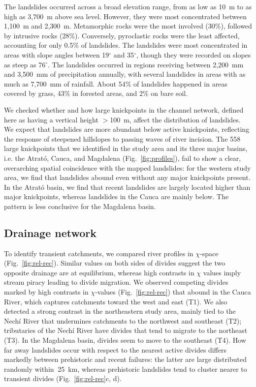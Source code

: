 \documentclass[draft]{agujournal2019}
\begin{document}
The landslides occurred across a broad elevation range, from as low as 10~m to as high as 3,700~m above sea level. However, they were most concentrated between 1,100~m and 2,300~m. Metamorphic rocks were the most involved (30\%), followed by intrusive rocks (28\%). Conversely, pyroclastic rocks were the least affected, accounting for only 0.5\% of landslides. The landslides were most concentrated in areas with slope angles between 19$^{\circ}$ and 35$^{\circ}$, though they were recorded on slopes as steep as 76$^{\circ}$. The landslides occurred in regions receiving between 2,200~mm and 3,500~mm of precipitation annually, with several landslides in areas with as much as 7,700~mm of rainfall. About 54\% of landslides happened in areas covered by grass, 43\% in forested areas, and 2\% on bare soil.

We checked whether and how large knickpoints in the channel network, defined here as having a vertical height $>$100~m, affect the distribution of landslides. We expect that landslides are more abundant below active knickpoints, reflecting the response of steepened hillslopes to passing waves of river incision. The 558 large knickpoints that we identified in the study area and its three major basins, i.e. the Atrató, Cauca, and Magdalena (Fig.~\ref{fig:profiles}), fail to show a clear, overarching spatial coincidence with the mapped landslides: for the western study area, we find that landslides abound even without any major knickpoints present. In the Atrató basin, we find that recent landslides are largely located higher than major knickpoints, whereas landslides in the Cauca are mainly below. The pattern is less conclusive for the Magdalena basin.

\subsection{Drainage network}

\par To identify transient catchments, we compared river profiles in $\chi$-space (Fig.~\ref{fig:rel-rec}). Similar values on both sides of divides suggest the two opposite drainage are at equilibrium, whereas high contrasts in $\chi$ values imply stream piracy leading to divide migration. We observed competing divides marked by high contrasts in $\chi$-values (Fig.~\ref{fig:rel-rec}) that abound in the Cauca River, which captures catchments toward the west and east (T1). We also detected a strong contrast in the northeastern study area, mainly tied to the Nechí River that undermines catchments to the northwest and southeast (T2); tributaries of the Nechí River have divides that tend to migrate to the northeast (T3). In the Magdalena basin, divides seem to move to the southeast (T4). How far away landslides occur with respect to the nearest active divides differs markedly between prehistoric and recent failures: the latter are large distributed randomly within $~$25~km, whereas prehistoric landslides tend to cluster nearer to transient divides (Fig.~\ref{fig:rel-rec}c, d).
\end{document}
